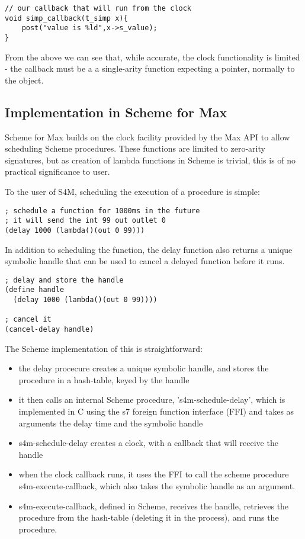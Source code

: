 \documentclass[acmsmall]{acmart}
\begin{document}
{\begin{verbatim}
// our callback that will run from the clock
void simp_callback(t_simp x){
    post("value is %ld",x->s_value);
}

\end{verbatim}

From the above we can see that, while accurate, the clock functionality is limited -
the callback must be a a single-arity function expecting a pointer, normally to the object.


\subsection{Implementation in Scheme for Max}

Scheme for Max builds on the clock facility provided by the Max API to allow scheduling
Scheme procedures. These functions are limited to zero-arity signatures, but as
creation of lambda functions in Scheme is trivial, this is of no practical significance to 
user.  

To the user of S4M, scheduling the execution of a procedure is simple:

\begin{verbatim}
; schedule a function for 1000ms in the future
; it will send the int 99 out outlet 0
(delay 1000 (lambda()(out 0 99)))
\end{verbatim}

In addition to scheduling the function, the delay function also returns a unique
symbolic handle that can be used to cancel a delayed function before it runs.

\begin{verbatim}
; delay and store the handle
(define handle 
  (delay 1000 (lambda()(out 0 99))))

; cancel it
(cancel-delay handle)
\end{verbatim}

The Scheme implementation of this is straightforward:
\begin{itemize}
\item the delay procecure creates a unique symbolic handle, and stores the procedure
  in a hash-table, keyed by the handle
\item it then calls an internal Scheme procedure, 's4m-schedule-delay', which is implemented
  in C using the s7 foreign function interface (FFI) and takes as arguments
  the delay time and the symbolic handle
\item s4m-schedule-delay creates a clock, with a callback that will receive the handle
\item when the clock callback runs, it uses the FFI to call the scheme procedure s4m-execute-callback,
  which also takes the symbolic handle as an argument.
\item s4m-execute-callback, defined in Scheme, receives the handle, retrieves the procedure
  from the hash-table (deleting it in the process), and runs the procedure.
\end{itemize}

}
\end{document}
